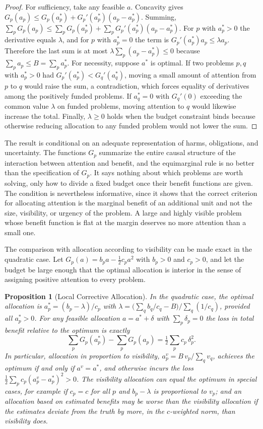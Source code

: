 \documentclass[11pt]{report}
\newtheorem{proposition}[theorem]{Proposition}
\theoremstyle{definition}
\theoremstyle{remark}
\begin{document}
\begin{proof}
For sufficiency, take any feasible $a$. Concavity gives $G_p(a_p)\le G_p(a_p^\ast)+G_p'(a_p^\ast)(a_p-a_p^\ast)$. Summing, $\sum_pG_p(a_p)\le\sum_pG_p(a^\ast_p)+\sum_pG_p'(a^\ast_p)(a_p-a^\ast_p)$. For $p$ with $a_p^\ast>0$ the derivative equals $\lambda$, and for $p$ with $a^\ast_p=0$ the term is $G_p'(a_p^\ast)a_p\le\lambda a_p$. Therefore the last sum is at most $\lambda\sum_p(a_p-a_p^\ast)\le0$ because $\sum_pa_p\le B=\sum_pa^\ast_p$. For necessity, suppose $a^\ast$ is optimal. If two problems $p,q$ with $a_p^\ast>0$ had $G_p'(a_p^\ast)<G_q'(a_q^\ast)$, moving a small amount of attention from $p$ to $q$ would raise the sum, a contradiction, which forces equality of derivatives among the positively funded problems. If $a_q^\ast=0$ with $G_q'(0)$ exceeding the common value $\lambda$ on funded problems, moving attention to $q$ would likewise increase the total. Finally, $\lambda\ge0$ holds when the budget constraint binds because otherwise reducing allocation to any funded problem would not lower the sum.
\end{proof}

The result is conditional on an adequate representation of harms, obligations, and uncertainty. The functions $G_p$ summarize the entire causal structure of the interaction between attention and benefit, and the equimarginal rule is no better than the specification of $G_p$. It says nothing about which problems are worth solving, only how to divide a fixed budget once their benefit functions are given. The condition is nevertheless informative, since it shows that the correct criterion for allocating attention is the marginal benefit of an additional unit and not the size, visibility, or urgency of the problem. A large and highly visible problem whose benefit function is flat at the margin deserves no more attention than a small one.

The comparison with allocation according to visibility can be made exact in the quadratic case. Let $G_p(a)=b_pa-\tfrac12c_pa^2$ with $b_p>0$ and $c_p>0$, and let the budget be large enough that the optimal allocation is interior in the sense of assigning positive attention to every problem.

\begin{proposition}[Local Corrective Allocation]\label{prop:local}
In the quadratic case, the optimal allocation is $a_p^\ast=(b_p-\lambda)/c_p$ with $\lambda=\bigl(\sum_qb_q/c_q-B\bigr)\big/\sum_q(1/c_q)$, provided all $a^\ast_p>0$. For any feasible allocation $a=a^\ast+\delta$ with $\sum_p\delta_p=0$ the loss in total benefit relative to the optimum is exactly
\[
\sum_pG_p(a_p^\ast)-\sum_pG_p(a_p)=\tfrac12\sum_pc_p\,\delta_p^2 .
\]
In particular, allocation in proportion to visibility, $a_p^v=B\,v_p/\sum_qv_q$, achieves the optimum if and only if $a^v=a^\ast$, and otherwise incurs the loss $\tfrac12\sum_pc_p(a_p^v-a_p^\ast)^2>0$. The visibility allocation can equal the optimum in special cases, for example if $c_p=c$ for all $p$ and $b_p-\lambda$ is proportional to $v_p$; and an allocation based on estimated benefits may be worse than the visibility allocation if the estimates deviate from the truth by more, in the $c$-weighted norm, than visibility does.
\end{proposition}
\end{document}
